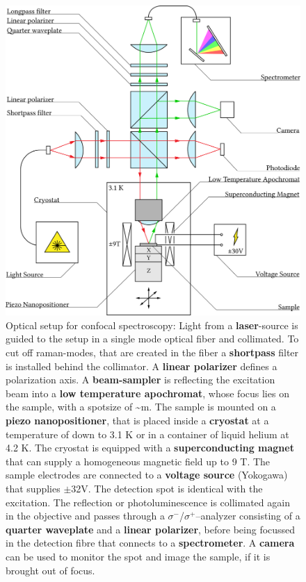 \begin{figure}
	\centering
	\includegraphics[width=.8\textwidth]{OptischerAufbau.png}
	\caption{Optical setup for confocal spectroscopy: Light from a \textbf{laser}-source is guided to the setup in a single mode optical fiber and collimated. To cut off raman-modes, that are created in the fiber a \textbf{shortpass} filter is installed behind the collimator. A \textbf{linear polarizer} defines a polarization axis. A \textbf{beam-sampler} is reflecting the excitation beam into a \textbf{low temperature apochromat}, whose focus lies on the sample, with a spotsize of \textasciitilde{}\mu m. The sample is mounted on a \textbf{piezo nanopositioner}, that is placed inside a \textbf{cryostat} at a temperature of down to 3.1 K or in a container of liquid helium at 4.2 K. The cryostat is equipped with a \textbf{superconducting magnet} that can supply a homogeneous magnetic field up to 9 T. The sample electrodes are connected to a \textbf{voltage source} (Yokogawa) that supplies {\small$\pm$}32V. The detection spot is identical with the excitation. The reflection or photoluminescence is collimated again in the objective and passes through a $\sigma^-$/$\sigma^+$--analyzer consisting of a \textbf{quarter waveplate} and a \textbf{linear polarizer}, before being focussed in the detection fibre that connects to a \textbf{spectrometer}. A \textbf{camera} can be used to monitor the spot and image the sample, if it is brought out of focus.}
	\label{opticalsetup}
\end{figure}

